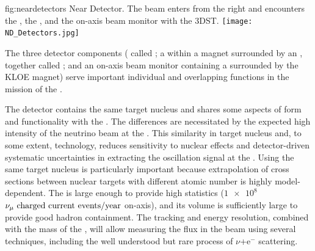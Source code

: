 \begin{dunefigure}
{fig:neardetectors}
{ Near Detector. The beam enters from the right and encounters
the , the , and the on-axis beam monitor with the 3DST.}
\texttt{[image: ND\_Detectors.jpg]}
\end{dunefigure}

The three detector components ( called ; a  within a magnet surrounded by an , together called ; and an on-axis beam monitor containing a  surrounded by the KLOE magnet) serve important individual and overlapping functions in the mission of the . 




The  detector contains the same target nucleus and shares some aspects of form and functionality with the . The differences are necessitated by the expected high intensity of the neutrino beam at the .  This similarity in target nucleus and, to some extent, technology, reduces sensitivity to nuclear effects and detector-driven systematic uncertainties in extracting the oscillation signal at the  . Using the same target nucleus is particularly important because extrapolation of cross sections between nuclear targets with different atomic number is highly model-dependent. The  is large enough to provide high statistics ($\num{1e8}$ ${\nu_\mu \text{ charged current events/year}}$ on-axis), and its volume is sufficiently large to provide good hadron containment.  The tracking and energy resolution, combined with the mass of the , will allow measuring the flux in the beam using several techniques, including the well understood but rare process of $\nu$+e$^{-}$ scattering.

